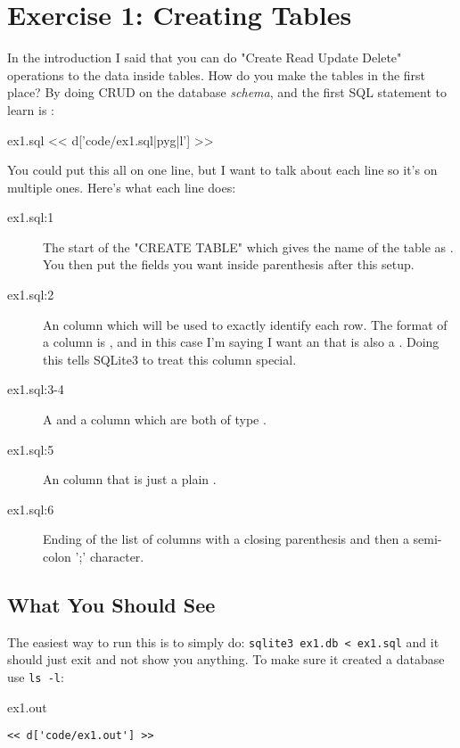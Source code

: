 \chapter{Exercise 1: Creating Tables}

In the introduction I said that you can do "Create Read Update Delete" operations to the data
inside tables.  How do you make the tables in the first place?  By doing CRUD on the database
\emph{schema}, and the first SQL statement to learn is :

\begin{code}{ex1.sql}
<< d['code/ex1.sql|pyg|l'] >>
\end{code}

You could put this all on one line, but I want to talk about each line
so it's on multiple ones.  Here's what each line does:

\begin{description}
\item[ex1.sql:1] The start of the "CREATE TABLE" which gives the name of the
    table as . You then put the fields you want inside parenthesis
    after this setup.
\item[ex1.sql:2] An  column which will be used to exactly identify
    each row.  The format of a column is , and in this case
    I'm saying I want an  that is also a .
    Doing this tells SQLite3 to treat this column special.
\item[ex1.sql:3-4] A  and a  column 
    which are both of type .
\item[ex1.sql:5] An  column that is just a plain .
\item[ex1.sql:6] Ending of the list of columns with a closing parenthesis and
    then a semi-colon ';' character.
\end{description}


\section{What You Should See}

The easiest way to run this is to simply do: \verb|sqlite3 ex1.db < ex1.sql| and
it should just exit and not show you anything.  To make sure it created a
database use \verb|ls -l|:


\begin{code}{ex1.out}
\begin{Verbatim}
<< d['code/ex1.out'] >>
\end{Verbatim}
\end{code}


